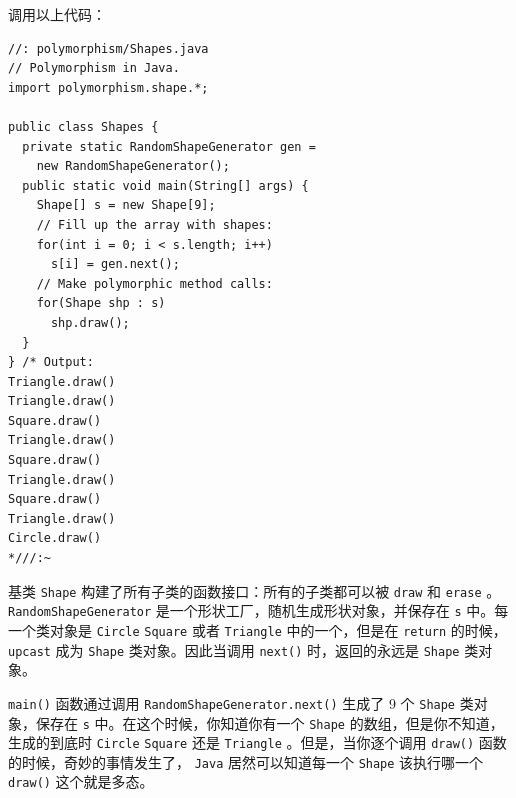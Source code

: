 \documentclass[10pt,a4paper,UTF8]{article}
\begin{document}
调用以上代码：
\lstset{language=java,label= ,caption= ,captionpos=b,firstnumber=1,numbers=left}
\begin{lstlisting}
//: polymorphism/Shapes.java
// Polymorphism in Java.
import polymorphism.shape.*;

public class Shapes {
  private static RandomShapeGenerator gen =
    new RandomShapeGenerator();
  public static void main(String[] args) {
    Shape[] s = new Shape[9];
    // Fill up the array with shapes:
    for(int i = 0; i < s.length; i++)
      s[i] = gen.next();
    // Make polymorphic method calls:
    for(Shape shp : s)
      shp.draw();
  }
} /* Output:
Triangle.draw()
Triangle.draw()
Square.draw()
Triangle.draw()
Square.draw()
Triangle.draw()
Square.draw()
Triangle.draw()
Circle.draw()
*///:~
\end{lstlisting}
基类 \texttt{Shape} 构建了所有子类的函数接口：所有的子类都可以被 \texttt{draw} 和 \texttt{erase} 。 \texttt{RandomShapeGenerator} 是一个形状工厂，随机生成形状对象，并保存在 \texttt{s} 中。每一个类对象是 \texttt{Circle} \texttt{Square} 或者 \texttt{Triangle} 中的一个，但是在 \texttt{return} 的时候， \texttt{upcast} 成为 \texttt{Shape} 类对象。因此当调用 \texttt{next()} 时，返回的永远是 \texttt{Shape} 类对象。

\texttt{main()} 函数通过调用 \texttt{RandomShapeGenerator.next()} 生成了 9 个 \texttt{Shape} 类对象，保存在 \texttt{s} 中。在这个时候，你知道你有一个 \texttt{Shape} 的数组，但是你不知道，生成的到底时 \texttt{Circle} \texttt{Square} 还是 \texttt{Triangle} 。但是，当你逐个调用 \texttt{draw()} 函数的时候，奇妙的事情发生了， \texttt{Java} 居然可以知道每一个 \texttt{Shape} 该执行哪一个 \texttt{draw()} 这个就是多态。
\end{document}
